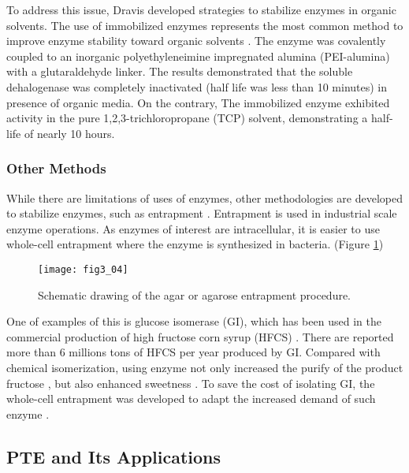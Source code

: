 \begin{refsection}
To address this issue, Dravis  developed strategies to
stabilize enzymes in organic solvents. The use of immobilized enzymes
represents the most common method to improve enzyme stability toward organic
solvents \cite{Koudelakova2013,Dravis2001}. The enzyme was covalently coupled
to an inorganic polyethyleneimine impregnated alumina (PEI-alumina) with a
glutaraldehyde linker. The results demonstrated that the soluble dehalogenase
was completely inactivated (half life was less than 10 minutes) in presence of organic
media. On the contrary, The immobilized enzyme exhibited activity in the pure
1,2,3-trichloropropane (TCP) solvent, demonstrating a half-life of nearly 10
hours.

\subsubsection{Other Methods}

While there are limitations of uses of enzymes, other methodologies are
developed to stabilize enzymes, such as entrapment
\cite{Trelles2013,Bhosale1996,Etzel1996}. Entrapment is used in industrial
scale enzyme operations. As enzymes of interest are intracellular, it is easier
to use whole-cell entrapment where the enzyme is synthesized in bacteria.
\cite{Trelles2013} (Figure \ref{fig:enzyme-entrapment})
\begin{figure}[h!] \centering \texttt{[image: fig3\_04]}
    \caption[Schematic drawing of the agar or agarose entrapment
    procedure]{Schematic drawing of the agar or agarose entrapment
        procedure.\cite{Trelles2013}}
    \label{fig:enzyme-entrapment} 
\end{figure}

One of examples of this is glucose isomerase (GI), which has been used in the
commercial production of high fructose corn syrup (HFCS) \cite{Bhosale1996}.
There are reported more than 6 millions tons of HFCS per year produced by GI.
Compared with chemical isomerization, using enzyme not only increased the
purify of the product fructose \cite{Barker1975}, but also enhanced sweetness
\cite{Bhosale1996}. To save the cost of isolating GI, the whole-cell
entrapment was developed to adapt the increased demand of such enzyme
\cite{Trelles2013}. 

\subsection{PTE and Its Applications}


\end{refsection}
